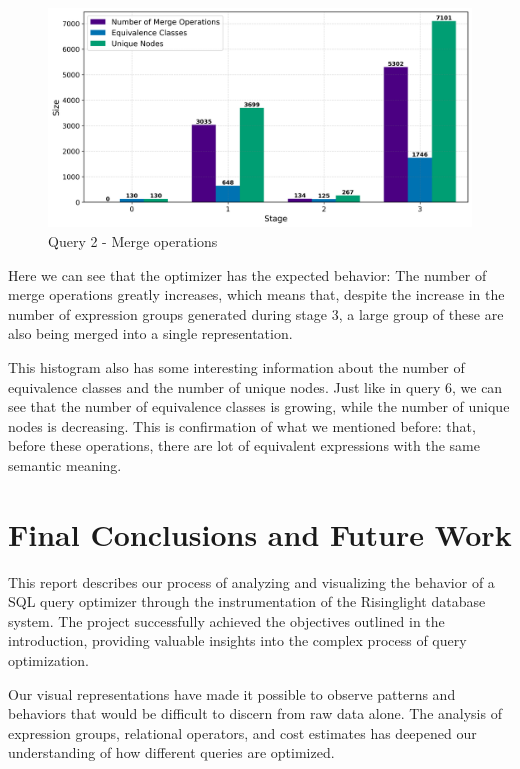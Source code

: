 \documentclass[a4paper,12pt]{scrreprt}
\begin{document}
\begin{figure}[H]
    \centering
    \includegraphics[width=\linewidth]{img_merges/q2_sizes.png}
    \caption{Query 2 - Merge operations}
    \label{fig:hist2}
\end{figure}

Here we can see that the optimizer has the expected behavior: The number of merge operations greatly increases, which means that, despite the increase in the number of expression groups generated during stage 3, a large group of these are also being merged into a single representation. 

This histogram also has some interesting information about the number of equivalence classes and the number of unique nodes. Just like in query 6, we can see that the number of equivalence classes is growing, while the number of unique nodes is decreasing. This is confirmation of what we mentioned before: that, before these operations, there are lot of equivalent expressions with the same semantic meaning. 


\chapter{Final Conclusions and Future Work} \label{chap:concl}
\thispagestyle{fancy}
This report describes our process of analyzing and visualizing the behavior of a SQL query optimizer through the instrumentation of the Risinglight database system. The project successfully achieved the objectives outlined in the introduction, providing valuable insights into the complex process of query optimization.

Our visual representations have made it possible to observe patterns and behaviors that would be difficult to discern from raw data alone. The analysis of expression groups, relational operators, and cost estimates has deepened our understanding of how different queries are optimized.
\end{document}
